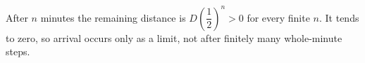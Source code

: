 After $n$ minutes the remaining distance is $D(\dfrac{1}{2})^n>0$ for every finite $n$. It tends to zero, so arrival occurs only as a limit, not after finitely many whole-minute steps.
